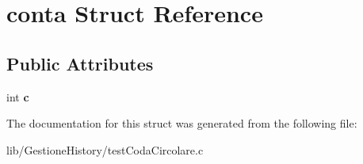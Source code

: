 \hypertarget{structconta}{}\section{conta Struct Reference}
\label{structconta}
\subsection*{Public Attributes}
\begin{DoxyCompactItemize}
\item 
\mbox{\label{structconta_a9534981bfe514fa9b837914023a86e11}} 
int {\bfseries c}
\end{DoxyCompactItemize}


The documentation for this struct was generated from the following file\+:\begin{DoxyCompactItemize}
\item 
lib/\+Gestione\+History/test\+Coda\+Circolare.\+c\end{DoxyCompactItemize}
